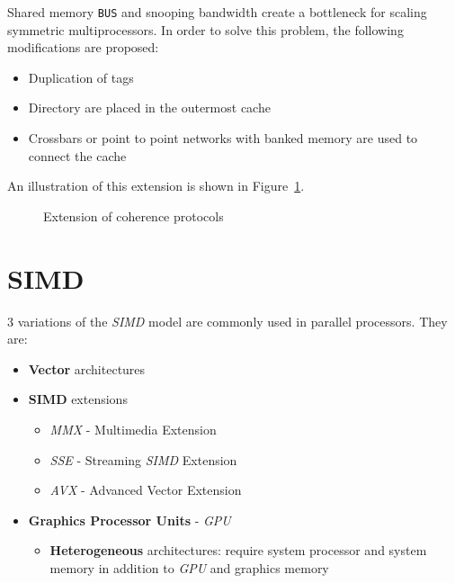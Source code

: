 \documentclass[english]{article}
\begin{document}
Shared memory \texttt{BUS} and snooping bandwidth create a bottleneck for scaling symmetric multiprocessors.
In order to solve this problem, the following modifications are proposed:

\begin{itemize}
  \item Duplication of tags
  \item Directory are placed in the outermost cache
  \item Crossbars or point to point networks with banked memory are used to connect the cache
\end{itemize}

\bigskip
An illustration of this extension is shown in Figure~\ref{fig:MESI-extension}.

\begin{figure}[htbp]
  \bigskip
  \centering
  \caption{Extension of coherence protocols}
  \label{fig:MESI-extension}
  \bigskip
\end{figure}

\clearpage

\section{SIMD}
\label{sec:simd}

\(3\) variations of the \textit{SIMD} model are commonly used in parallel processors.
They are:

\begin{itemize}
  \item \textbf{Vector} architectures
  \item \textbf{SIMD} extensions
        \begin{itemize}
          \item \textit{MMX} - Multimedia Extension
          \item \textit{SSE} - Streaming \textit{SIMD} Extension
          \item \textit{AVX} - Advanced Vector Extension
        \end{itemize}
  \item \textbf{Graphics Processor Units} - \textit{GPU}
        \begin{itemize}
          \item \textbf{Heterogeneous} architectures: require system processor and system memory in addition to \textit{GPU} and graphics memory
        \end{itemize}
\end{itemize}
\end{document}
